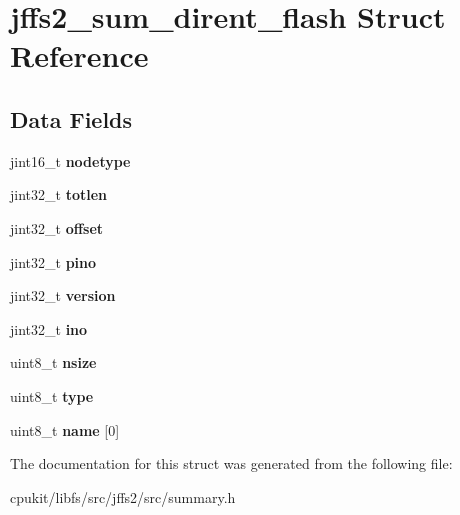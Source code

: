 \hypertarget{structjffs2__sum__dirent__flash}{}\section{jffs2\+\_\+sum\+\_\+dirent\+\_\+flash Struct Reference}
\label{structjffs2__sum__dirent__flash}
\subsection*{Data Fields}
\begin{DoxyCompactItemize}
\item 
\mbox{\label{structjffs2__sum__dirent__flash_aad1373257c76c6639677c1dc93ba86f1}} 
jint16\+\_\+t {\bfseries nodetype}
\item 
\mbox{\label{structjffs2__sum__dirent__flash_ac036f3820efb8442ea24dba14058ac04}} 
jint32\+\_\+t {\bfseries totlen}
\item 
\mbox{\label{structjffs2__sum__dirent__flash_a8df9b1ce7eb08179f4c34f59ec99ffe4}} 
jint32\+\_\+t {\bfseries offset}
\item 
\mbox{\label{structjffs2__sum__dirent__flash_a0b28432cbde294c4731a790997626802}} 
jint32\+\_\+t {\bfseries pino}
\item 
\mbox{\label{structjffs2__sum__dirent__flash_ab2d5cdd1d54598aa41c86172932bdb47}} 
jint32\+\_\+t {\bfseries version}
\item 
\mbox{\label{structjffs2__sum__dirent__flash_a1ed29db67329bcbfbffba36d83b5cb95}} 
jint32\+\_\+t {\bfseries ino}
\item 
\mbox{\label{structjffs2__sum__dirent__flash_a7c83e8208cd30ea3dfc6721f32052e69}} 
uint8\+\_\+t {\bfseries nsize}
\item 
\mbox{\label{structjffs2__sum__dirent__flash_a867396aa6e30740744c997ad3158e84e}} 
uint8\+\_\+t {\bfseries type}
\item 
\mbox{\label{structjffs2__sum__dirent__flash_afbdd88d6891588c976ebda9a37ede6c6}} 
uint8\+\_\+t {\bfseries name} \mbox{[}0\mbox{]}
\end{DoxyCompactItemize}


The documentation for this struct was generated from the following file\+:\begin{DoxyCompactItemize}
\item 
cpukit/libfs/src/jffs2/src/summary.\+h\end{DoxyCompactItemize}
